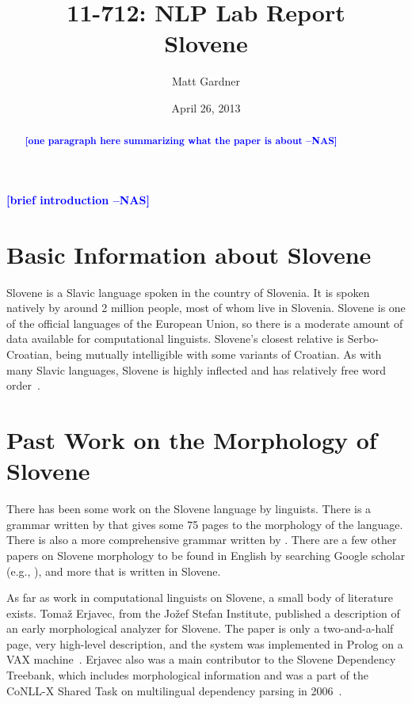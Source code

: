 \documentclass[11pt,letterpaper]{article}
\title{11-712:  NLP Lab Report\\Slovene}
\author{Matt Gardner}
\date{April 26, 2013}
\newcommand{\nascomment}[1]{\textcolor{blue}{\textbf{[#1 --NAS]}}}
\begin{document}
\maketitle
\begin{abstract}
\nascomment{one paragraph here summarizing what the paper is about}
\end{abstract}

\nascomment{brief introduction}

\section{Basic Information about Slovene}

Slovene is a Slavic language spoken in the country of Slovenia.  It is spoken
natively by around 2 million people, most of whom live in Slovenia.  Slovene is
one of the official languages of the European Union, so there is a moderate
amount of data available for computational linguists.  Slovene's closest
relative is Serbo-Croatian, being mutually intelligible with some variants of
Croatian.  As with many Slavic languages, Slovene is highly inflected and has
relatively free word order~\citep{wikipedia-slovene}.

\section{Past Work on the Morphology of Slovene}

There has been some work on the Slovene language by linguists.  There is a
grammar written by \cite{greenberg-2006-slovene-grammar} that gives some 75
pages to the morphology of the language.  There is also a more comprehensive
grammar written by \cite{herrity-2000-slovene-grammar}.  There are a few other
papers on Slovene morphology to be found in English by searching Google scholar
(e.g., \cite{bidwell-1969-outline-slovene-morphology}), and more that is
written in Slovene.

As far as work in computational linguists on Slovene, a small body of
literature exists.  Toma\v{z} Erjavec, from the Jo\v{z}ef Stefan Institute,
published a description of an early morphological analyzer for Slovene.  The
paper is only a two-and-a-half page, very high-level description, and the
system was implemented in Prolog on a VAX
machine~\citep{erjavec-1990-slovene-analyzer}.  Erjavec also was a main
contributor to the Slovene Dependency Treebank, which includes morphological
information and was a part of the CoNLL-X Shared Task on multilingual
dependency parsing in 2006~\citep{dvzeroski-2006-sdt}.
\end{document}
